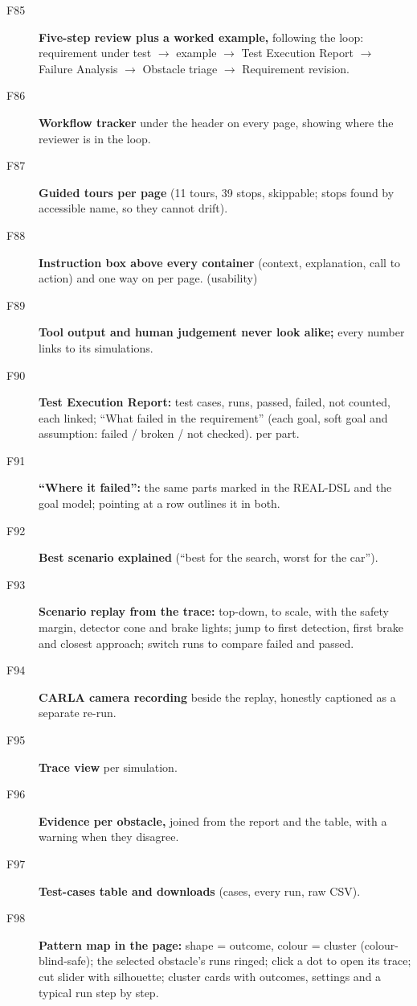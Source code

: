 \begin{description}
\item[F85] \textbf{Five-step review plus a worked example,} following the loop: requirement under test $\rightarrow$ example $\rightarrow$ Test Execution Report $\rightarrow$ Failure Analysis $\rightarrow$ Obstacle triage $\rightarrow$ Requirement revision. 
\item[F86] \textbf{Workflow tracker} under the header on every page, showing where the reviewer is in the loop. \tagnew{}
\item[F87] \textbf{Guided tours per page} (11 tours, 39 stops, skippable; stops found by accessible name, so they cannot drift). \tagnew{}
\item[F88] \textbf{Instruction box above every container} (context, explanation, call to action) and one way on per page. \tagnew{} (usability)
\item[F89] \textbf{Tool output and human judgement never look alike;} every number links to its simulations. \tagnew{}
\item[F90] \textbf{Test Execution Report:} test cases, runs, passed, failed, not counted, each linked; ``What failed in the requirement'' (each goal, soft goal and assumption: failed / broken / not checked).  \tagnew{} per part.
\item[F91] \textbf{``Where it failed'':} the same parts marked in the REAL-DSL and the goal model; pointing at a row outlines it in both. \tagnew{}
\item[F92] \textbf{Best scenario explained} (``best for the search, worst for the car''). \tagnew{}
\item[F93] \textbf{Scenario replay from the trace:} top-down, to scale, with the safety margin, detector cone and brake lights; jump to first detection, first brake and closest approach; switch runs to compare failed and passed. \tagnew{} 
\item[F94] \textbf{CARLA camera recording} beside the replay, honestly captioned as a separate re-run. \taginfra
\item[F95] \textbf{Trace view} per simulation. 
\item[F96] \textbf{Evidence per obstacle,} joined from the report and the table, with a warning when they disagree. \tagnew{}
\item[F97] \textbf{Test-cases table and downloads} (cases, every run, raw CSV). \taginfra
\item[F98] \textbf{Pattern map in the page:} shape = outcome, colour = cluster (colour-blind-safe); the selected obstacle's runs ringed; click a dot to open its trace; cut slider with silhouette; cluster cards with outcomes, settings and a typical run step by step. \tagnew{}

\end{description}
